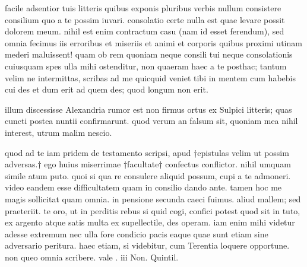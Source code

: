 


 facile adsentior tuis litteris quibus exponis pluribus verbis nullum consistere consilium quo a te possim iuvari. consolatio certe nulla est quae levare possit dolorem meum. nihil est enim contractum casu (nam id esset ferendum), sed omnia fecimus iis erroribus et miseriis et animi et corporis quibus proximi utinam mederi maluissent! quam ob rem quoniam neque consili tui neque consolationis cuiusquam spes ulla mihi ostenditur, non quaeram haec a te posthac; tantum velim ne intermittas, scribas ad me quicquid veniet tibi in mentem cum habebis cui des et dum erit ad quem des; quod longum non erit.

 illum discessisse Alexandria rumor est non firmus ortus ex Sulpici litteris; quas cuncti postea nuntii confirmarunt. quod verum an falsum sit, quoniam mea nihil interest, utrum malim nescio.

 quod ad te iam pridem de testamento scripsi, apud †epistulas velim ut possim adversas.† ego huius miserrimae †facultate† confectus conflictor. nihil umquam simile atum puto. quoi si qua re consulere aliquid possum, cupi a te admoneri. video eandem esse difficultatem quam in consilio dando ante. tamen hoc me magis sollicitat quam omnia. in pensione secunda caeci fuimus. aliud mallem; sed praeteriit. te oro, ut in perditis rebus si quid cogi, confici potest quod sit in tuto, ex argento atque satis multa ex supellectile, des operam. iam enim mihi videtur adesse extremum nec ulla fore condicio pacis eaque quae sunt etiam sine adversario peritura. haec etiam, si videbitur, cum Terentia loquere opportune. non queo omnia scribere. vale . iii Non. Quintil.

